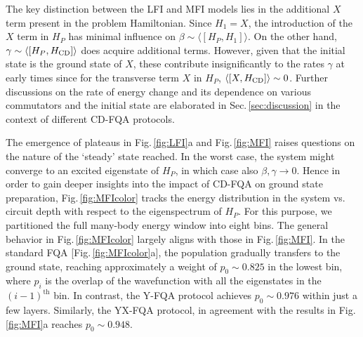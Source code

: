 \documentclass[twocolumn,aps,superscriptaddress,floatfix,longbibliography]{revtex4-2}
\newcommand{\Sec}[1]{Sec.\,\ref{#1}}
\newcommand{\Fig}[1]{Fig.\,\ref{fig:#1}}
\def\ZZ{\ensuremath{\mathit{ZZ}}\xspace}
\begin{document}
The key distinction between the LFI and MFI models lies in the
additional $X$ term present in the problem Hamiltonian.
Since $H_1=X$, the introduction of the $X$ term in $H_P$
has minimal influence on $\beta \sim \langle [H_P,H_1]\rangle$.
On the other hand, %
$\gamma\sim \langle [H_P,H_{\rm CD}]\rangle $ %
does acquire %
additional terms. %
However,
given that the initial state is the ground state of $X$,
these %
contribute insignificantly to the rates $\gamma$ at early times
since for the transverse term $X$ in $H_P$,
$\langle[X, H_{\rm CD}]\rangle \sim 0$.
Further discussions on the rate of energy change and its
dependence on various commutators and the initial state are
elaborated in \Sec{sec:discussion} %
in the context of different CD-FQA
protocols.

The emergence of plateaus in \Fig{LFI}a and
\Fig{MFI} raises questions on the nature of the `steady'
state reached. In the worst case, the system might converge to an
excited eigenstate of $H_P$, in which case also
$\beta,\gamma \to 0$. Hence in order
to gain deeper insights into the impact of CD-FQA on ground
state preparation, \Fig{MFIcolor} 
tracks the energy distribution in the system
vs. circuit depth with respect to the eigenspectrum of $H_P$.
For this purpose, we partitioned %
the full many-body energy window %
into eight bins. The general behavior %
in \Fig{MFIcolor} largely aligns with those in \Fig{MFI}.
In the standard FQA [\Fig{MFIcolor}a], the
population gradually transfers to the ground state, reaching
approximately a weight of $p_0 \sim 0.825$ in the lowest bin, where $p_i$ is the overlap of the wavefunction with all the eigenstates in the $(i-1)^{\text{th}}$ bin. 
In contrast, the Y-FQA protocol achieves %
$p_0 \sim 0.976$ within just a few layers.
%
Similarly, %
the YX-FQA protocol, in agreement with the results in
\Fig{MFI}a reaches %
$p_0 \sim 0.948$.
\end{document}
